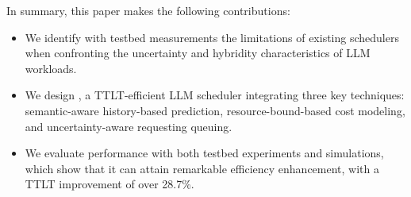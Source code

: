 In summary, this paper makes the following contributions:
\begin{itemize}
    \item We identify with testbed measurements the limitations of existing schedulers when confronting the uncertainty and hybridity characteristics of LLM workloads. %
    \item We design \oursched, a TTLT-efficient LLM scheduler integrating three key techniques: semantic-aware history-based prediction, resource-bound-based cost modeling, and uncertainty-aware requesting queuing. %
    \item We evaluate \oursched performance with both testbed experiments and simulations, which show that it can attain remarkable efficiency enhancement, with a TTLT improvement of over 28.7\%.

\end{itemize}